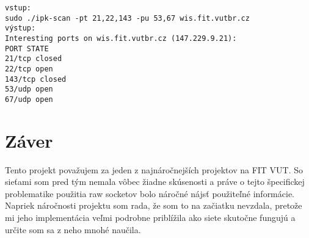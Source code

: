 \documentclass[11pt, a4paper]{article}
\begin{document}
\texttt{vstup:} \\
\texttt{sudo ./ipk-scan -pt 21,22,143 -pu 53,67 wis.fit.vutbr.cz}\\

\texttt{výstup:}\\
\texttt{Interesting ports on wis.fit.vutbr.cz (147.229.9.21):}\\
\texttt{PORT	STATE}\\
\texttt{21/tcp	closed}\\
\texttt{22/tcp	open}\\
\texttt{143/tcp	closed}\\
\texttt{53/udp	open}\\
\texttt{67/udp	open}


\section{Záver}
Tento projekt považujem za jeden z najnáročnejších projektov na FIT VUT. So sieťami som pred tým nemala vôbec žiadne skúsenosti a práve o tejto špecifickej problematike použitia raw socketov bolo náročné nájsť použiteľné informácie. Napriek náročnosti projektu som rada, že som to na začiatku nevzdala, pretože mi jeho implementácia veľmi podrobne priblížila ako siete skutočne fungujú a určite som sa z neho mnohé naučila.

\newpage

\renewcommand{\refname}{Použité zdroje}

\end{document}
